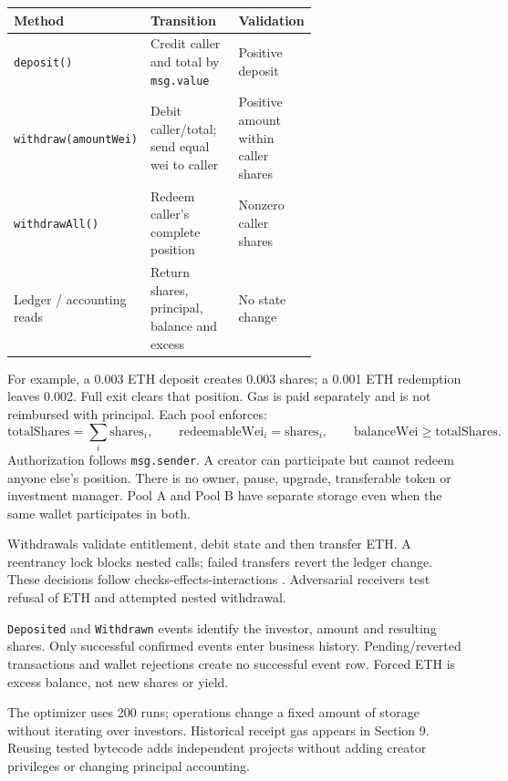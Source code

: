 \documentclass[10pt,a4paper]{article}
\begin{document}
\begin{center}\small
{}\label{tab:contract}
\begin{tabularx}{\linewidth}{@{}p{0.29\linewidth}p{0.37\linewidth}X@{}}
\toprule\textbf{Method} & \textbf{Transition} & \textbf{Validation} \\
\midrule
\texttt{deposit()} & Credit caller and total by \texttt{msg.value} & Positive deposit \\
\texttt{withdraw(amountWei)} & Debit caller/total; send equal wei to caller & Positive amount within caller shares \\
\texttt{withdrawAll()} & Redeem caller's complete position & Nonzero caller shares \\
Ledger / accounting reads & Return shares, principal, balance and excess & No state change \\
\bottomrule
\end{tabularx}
\end{center}
For example, a 0.003 ETH deposit creates 0.003 shares; a 0.001 ETH redemption leaves 0.002. Full exit clears that position. Gas is paid separately and is not reimbursed with principal. Each pool enforces:
\[
\mathrm{totalShares}=\sum_i\mathrm{shares}_i,\qquad
\mathrm{redeemableWei}_i=\mathrm{shares}_i,\qquad
\mathrm{balanceWei}\geq\mathrm{totalShares}.
\]
Authorization follows \texttt{msg.sender}. A creator can participate but cannot redeem anyone else's position. There is no owner, pause, upgrade, transferable token or investment manager. Pool A and Pool B have separate storage even when the same wallet participates in both.

Withdrawals validate entitlement, debit state and then transfer ETH. A reentrancy lock blocks nested calls; failed transfers revert the ledger change. These decisions follow checks-effects-interactions \cite{solidity}. Adversarial receivers test refusal of ETH and attempted nested withdrawal.

\texttt{Deposited} and \texttt{Withdrawn} events identify the investor, amount and resulting shares. Only successful confirmed events enter business history. Pending/reverted transactions and wallet rejections create no successful event row. Forced ETH is excess balance, not new shares or yield.

The optimizer uses 200 runs; operations change a fixed amount of storage without iterating over investors. Historical receipt gas appears in Section 9. Reusing tested bytecode adds independent projects without adding creator privileges or changing principal accounting.
\end{document}
